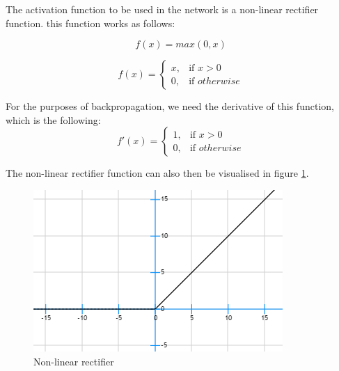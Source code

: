 \documentclass[10pt]{article}
\begin{document}
		The activation function to be used in the network is a non-linear rectifier function. this function works as follows:
		
		\begin{equation}\label{eq:activ2}
				f(x) = max (0, x)
		\end{equation}
		
		\begin{equation}\label{eq:activ1}
			f(x) =
			\begin{cases}
   				x,& \text{if } x > 0\\
    			0,& \text{if } otherwise
			\end{cases}
		\end{equation}	
		
		For the purposes of backpropagation, we need the derivative of this function, which is the following:
		\begin{equation}\label{eq:activ1}
			f'(x) =
			\begin{cases}
   				1,& \text{if } x > 0\\
    			0,& \text{if } otherwise
			\end{cases}
		\end{equation}
		
		The non-linear rectifier function can also then be visualised in figure \ref{fig:nlrf}.	
		
		\begin{figure}[h]
    		\centering
			\includegraphics[scale=0.8]{img/linearity}
			\caption{Non-linear rectifier}
			\label{fig:nlrf}
		\end{figure}
	\medskip
	
\end{document}

